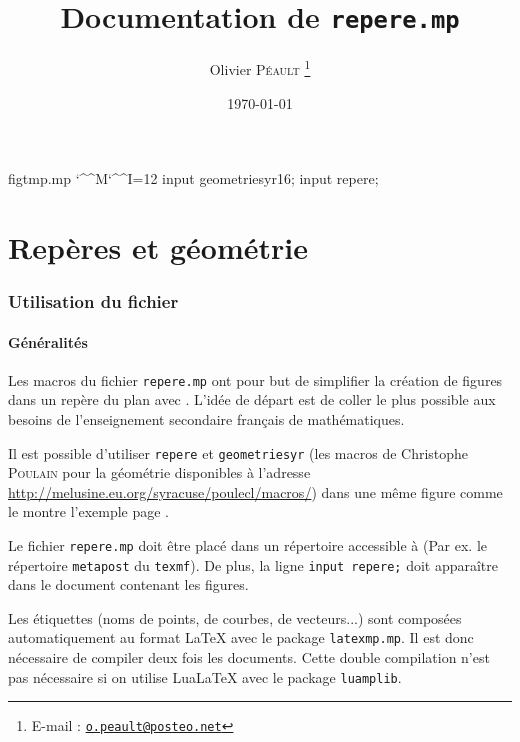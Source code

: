 \documentclass[11pt,a4paper,french]{article}
\makeatletter
\def\verbatimwrite{%
  \@bsphack
  \immediate\openout \temp@code figtmp.mp
  \let\do\@makeother\dospecials
  \catcode`\^^M\active \catcode`\^^I=12
  \def\verbatim@processline{%
    \immediate\write\verbatim@out
      {\the\verbatim@line}%
    \immediate\write\temp@code
          {\the\verbatim@line}
     }%
  \verbatim@start}
\def\endverbatimwrite{%
  \immediate\closeout\temp@code
  \@esphack
  }%
\newenvironment{codecache}%
            {\verbatimwrite}{\endverbatimwrite}
\makeatother
\begin{document}
\title{Documentation de \texttt{repere.mp}}
\date{\today}
\author{Olivier \textsc{Péault}%
\footnote{E-mail : \href{mailto:o.peault@posteo.net}{\texttt{o.peault@posteo.net}}}}
\maketitle

\setcounter{tocdepth}{2}

\setlength{\columnsep}{25pt}
\tableofcontents
\setlength{\columnsep}{10pt}




\begin{codecache}
input geometriesyr16;
input repere;
\end{codecache}

\part{Repères et géométrie}
\section{Utilisation du fichier}

\subsection{Généralités}
Les macros du fichier \verb+repere.mp+ ont pour but de simplifier la création de figures dans un repère du plan avec \MP{}. L'idée de départ est de coller le plus possible aux besoins de l'enseignement secondaire français de mathématiques.

Il est possible d'utiliser \verb+repere+ et \verb+geometriesyr+ (les macros de Christophe \textsc{Poulain} pour la géométrie disponibles à l'adresse \url{http://melusine.eu.org/syracuse/poulecl/macros/}) dans une même figure comme le montre l'exemple page \pageref{exgeom}.

Le fichier \verb+repere.mp+ doit être placé dans un répertoire accessible à \MP{} (Par ex. le répertoire \verb+metapost+ du \verb+texmf+). De plus, la ligne \verb+input repere;+ doit apparaître dans le document contenant les figures.


Les étiquettes (noms de points, de courbes, de vecteurs...) sont composées automatiquement au format \LaTeX{} avec le package \verb+latexmp.mp+. Il est donc nécessaire de compiler deux fois les documents. Cette double compilation n'est pas nécessaire si on utilise Lua\LaTeX{} avec le package \verb|luamplib|.
\end{document}

